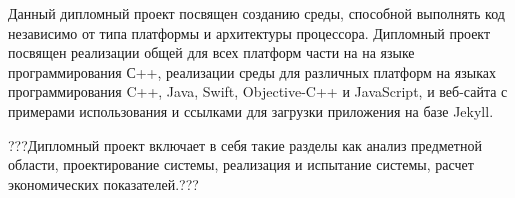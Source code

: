 Данный дипломный проект посвящен созданию среды, способной выполнять код независимо от типа платформы и архитектуры процессора.
Дипломный проект посвящен реализации общей для всех платформ части на на языке программирования С++, реализации среды для различных платформ
на языках программирования C++, Java, Swift, Objective-C++ и JavaScript, %
и веб-сайта с примерами использования и ссылками для загрузки приложения на базе Jekyll.

???Дипломный проект включает в себя такие разделы как
анализ предметной области,
проектирование системы,
реализация и испытание системы,
расчет экономических показателей.???
